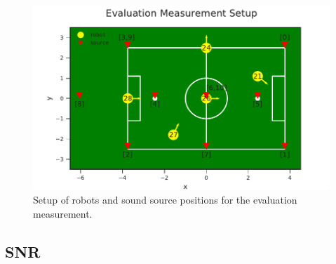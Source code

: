 \begin{figure}[ht]
	\centering
		\includegraphics[]{figures/evaluation/setup}
	\caption{Setup of robots and sound source positions for the evaluation measurement.}
    \label{fig:04_setup}
\end{figure}

\subsection{SNR}
\label{subsec:04_snr}

